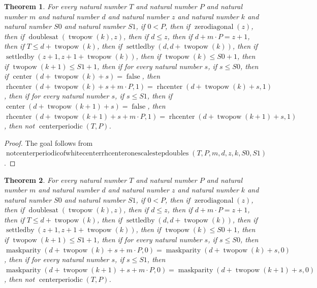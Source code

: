 \documentclass[11pt]{article}
\newtheorem{theorem}{Theorem}[section]
\theoremstyle{definition}
\begin{document}
\begin{theorem}
\label{ll:paper:not-centerperiodic-of-white-center-rhcenter-one-scale-step-doubles}
For every natural number \(T\) and natural number \(P\) and natural number \(m\) and natural number \(d\) and natural number \(z\) and natural number \(k\) and natural number \(S0\) and natural number \(S1\), if \(0 < P\), then if \(\operatorname{zerodiagonal}(z)\), then if \(\operatorname{doublesat}(\operatorname{twopow}(k), z)\), then if \(d \le z\), then if \(d + m \cdot P = z + 1\), then if \(T \le d + \operatorname{twopow}(k)\), then if \(\operatorname{settledby}(d, d + \operatorname{twopow}(k))\), then if \(\operatorname{settledby}(z + 1, z + 1 + \operatorname{twopow}(k))\), then if \(\operatorname{twopow}(k) \le S0 + 1\), then if \(\operatorname{twopow}(k + 1) \le S1 + 1\), then if for every natural number \(s\), if \(s \le S0\), then if \(\operatorname{center}(d + \operatorname{twopow}(k) + s) = \operatorname{false}\), then \(\operatorname{rhcenter}(d + \operatorname{twopow}(k) + s + m \cdot P, 1) = \operatorname{rhcenter}(d + \operatorname{twopow}(k) + s, 1)\), then if for every natural number \(s\), if \(s \le S1\), then if \(\operatorname{center}(d + \operatorname{twopow}(k + 1) + s) = \operatorname{false}\), then \(\operatorname{rhcenter}(d + \operatorname{twopow}(k + 1) + s + m \cdot P, 1) = \operatorname{rhcenter}(d + \operatorname{twopow}(k + 1) + s, 1)\), then not \(\operatorname{centerperiodic}(T, P)\).
\end{theorem}
\begin{proof}
The goal follows from \(\operatorname{notcenterperiodicofwhitecenterrhcenteronescalestepdoubles}(T, P, m, d, z, k, S0, S1)\).
\end{proof}
\begin{theorem}
\label{ll:paper:not-centerperiodic-of-maskparity-zero-agree-scale-step-doubles}
For every natural number \(T\) and natural number \(P\) and natural number \(m\) and natural number \(d\) and natural number \(z\) and natural number \(k\) and natural number \(S0\) and natural number \(S1\), if \(0 < P\), then if \(\operatorname{zerodiagonal}(z)\), then if \(\operatorname{doublesat}(\operatorname{twopow}(k), z)\), then if \(d \le z\), then if \(d + m \cdot P = z + 1\), then if \(T \le d + \operatorname{twopow}(k)\), then if \(\operatorname{settledby}(d, d + \operatorname{twopow}(k))\), then if \(\operatorname{settledby}(z + 1, z + 1 + \operatorname{twopow}(k))\), then if \(\operatorname{twopow}(k) \le S0 + 1\), then if \(\operatorname{twopow}(k + 1) \le S1 + 1\), then if for every natural number \(s\), if \(s \le S0\), then \(\operatorname{maskparity}(d + \operatorname{twopow}(k) + s + m \cdot P, 0) = \operatorname{maskparity}(d + \operatorname{twopow}(k) + s, 0)\), then if for every natural number \(s\), if \(s \le S1\), then \(\operatorname{maskparity}(d + \operatorname{twopow}(k + 1) + s + m \cdot P, 0) = \operatorname{maskparity}(d + \operatorname{twopow}(k + 1) + s, 0)\), then not \(\operatorname{centerperiodic}(T, P)\).
\end{theorem}
\end{document}
